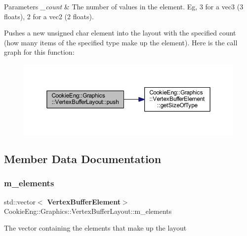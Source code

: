 \begin{DoxyParams}{Parameters}
{\em \+\_\+count} & The number of values in the element. Eg, 3 for a vec3 (3 floats), 2 for a vec2 (2 floats).\\
\hline
\end{DoxyParams}
Pushes a new unsigned char element into the layout with the specified count (how many items of the specified type make up the element). Here is the call graph for this function\+:
\nopagebreak
\begin{figure}[H]
\begin{center}
\leavevmode
\includegraphics[width=350pt]{class_cookie_eng_1_1_graphics_1_1_vertex_buffer_layout_a3f1a639714762ec45edf48a68995d7bd_cgraph}
\end{center}
\end{figure}


\subsection{Member Data Documentation}
\mbox{\label{class_cookie_eng_1_1_graphics_1_1_vertex_buffer_layout_a7986bf1ce59d1ffa1dc31613014aa2e7}} 
\subsubsection{m\+\_\+elements}
{\footnotesize\ttfamily std\+::vector$<$\textbf{ Vertex\+Buffer\+Element}$>$ Cookie\+Eng\+::\+Graphics\+::\+Vertex\+Buffer\+Layout\+::m\+\_\+elements\hspace{0.3cm}{\ttfamily [protected]}}

The vector containing the elements that make up the layout \mbox{\label{class_cookie_eng_1_1_graphics_1_1_vertex_buffer_layout_a972f0e9224f28b13be7d959449423308}} 
